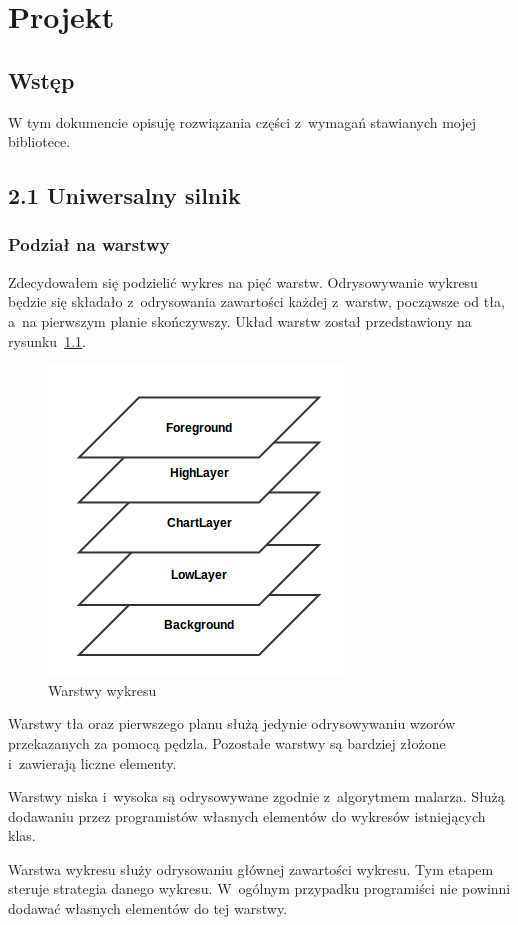 \chapter{Projekt}
\section{Wstęp}
W tym dokumencie opisuję rozwiązania części z~wymagań stawianych mojej bibliotece.

\section{2.1 Uniwersalny silnik}
\subsection{Podział na warstwy}
Zdecydowałem się podzielić wykres na pięć warstw. Odrysowywanie wykresu będzie się składało z~odrysowania zawartości każdej z~warstw, począwsze od tła, a~na pierwszym planie skończywszy.
Układ warstw został przedstawiony na rysunku~\ref{rys:warstwy}.

\begin{figure}
\centering
\caption{Warstwy wykresu}\label{rys:warstwy}
\includegraphics[scale=0.6]{img/warstwy.png}
\end{figure}

Warstwy tła oraz pierwszego planu służą jedynie odrysowywaniu wzorów przekazanych za pomocą pędzla. Pozostałe warstwy są bardziej złożone i~zawierają liczne elementy.

Warstwy niska i~wysoka są odrysowywane zgodnie z~algorytmem malarza. Służą dodawaniu przez programistów własnych elementów do wykresów istniejących klas.

Warstwa wykresu służy odrysowaniu głównej zawartości wykresu. Tym etapem steruje strategia danego wykresu. W~ogólnym przypadku programiści nie powinni dodawać własnych elementów do tej warstwy.


